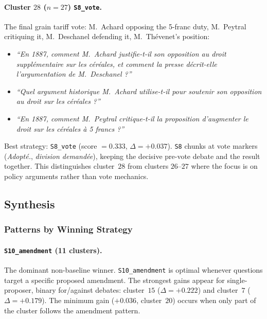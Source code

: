 \paragraph{Cluster $28$ ($n=27$) \texttt{S8\_vote}.}
The final grain tariff vote: M.~Achard opposing the 5-franc duty, M.~Peytral
critiquing it, M.~Deschanel defending it, M.~Th\'{e}venet's position:
\begin{itemize}
  \item \textit{``En 1887, comment M.~Achard justifie-t-il son opposition au droit
    suppl\'{e}mentaire sur les c\'{e}r\'{e}ales, et comment la presse
    d\'{e}crit-elle l'argumentation de M.~Deschanel ?''}
  \item \textit{``Quel argument historique M.~Achard utilise-t-il pour soutenir
    son opposition au droit sur les c\'{e}r\'{e}ales ?''}
  \item \textit{``En 1887, comment M.~Peytral critique-t-il la proposition
    d'augmenter le droit sur les c\'{e}r\'{e}ales \`{a} 5 francs ?''}
\end{itemize}
Best strategy: \texttt{S8\_vote} (score $= 0.333$, $\Delta = +0.037$).
\texttt{S8} chunks at vote markers (\textit{Adopt\'{e}.}, \textit{division
demand\'{e}e}), keeping the decisive pre-vote debate and the result together.
This distinguishes cluster~$28$ from clusters $26$--$27$ where the focus is on
policy arguments rather than vote mechanics.

\subsection{Synthesis}
\label{sec:synthesis}

\subsubsection{Patterns by Winning Strategy}

\paragraph{\texttt{S10\_amendment} (11 clusters).}
The dominant non-baseline winner.
\texttt{S10\_amendment} is optimal whenever questions target a specific proposed
amendment.
The strongest gains appear for single-proposer, binary for/against debates:
cluster~$15$ ($\Delta = +0.222$) and cluster~$7$ ($\Delta = +0.179$).
The minimum gain ($+0.036$, cluster~$20$) occurs when only part of the cluster
follows the amendment pattern.

